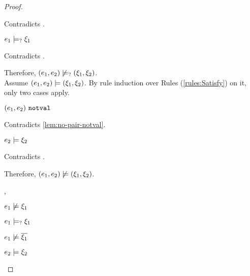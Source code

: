 \begin{proof}
\begin{byCases}
\begin{byCases}
\begin{byCases}
\begin{byCases}
\begin{pfsteps*}
                \end{pfsteps*}
                Contradicts .
            \item[\text{(\ref{rule:CMSPair3})}]
                \begin{pfsteps*}
                \item $e_1 \models_{?} \xi_1$ 
                \end{pfsteps*}
                Contradicts .
            \end{byCases}
            Therefore, $(e_1 , e_2) \not\models_{?} (\xi_1 , \xi_2)$.\\
            Assume $(e_1 , e_2) \models (\xi_1 , \xi_2)$. By rule induction over Rules (\ref{rules:Satisfy}) on it, only two cases apply. 
           \begin{byCases}
            \item[\text{(\ref{rule:CSNotValPair})}]
                \begin{pfsteps*}
                \item $(e_1 , e_2) ~\mathtt{notval}$ 
                \end{pfsteps*}
                Contradicts \autoref{lem:no-pair-notval}.
            \item[\text{(\ref{rule:CSPair})}]
                \begin{pfsteps*}
                \item $e_2 \models \xi_2$ 
                \end{pfsteps*}
                Contradicts .
            \end{byCases}
            Therefore, $(e_1 , e_2) \not\models (\xi_1 , \xi_2)$.
        \item[\cmaysatisfy{e_1}{\xi_1},\csatisfy{e_2}{\xi_2}]
            \begin{pfsteps*}
            \item $e_1 \not\models \xi_1$  
            \item $e_1 \models_{?} \xi_1$  
            \item $e_1 \not\models \overline{\xi_1}$  
            \item $e_2 \models \xi_2$  

\end{pfsteps*}
\end{byCases}
\end{byCases}
\end{byCases}
\end{proof}
